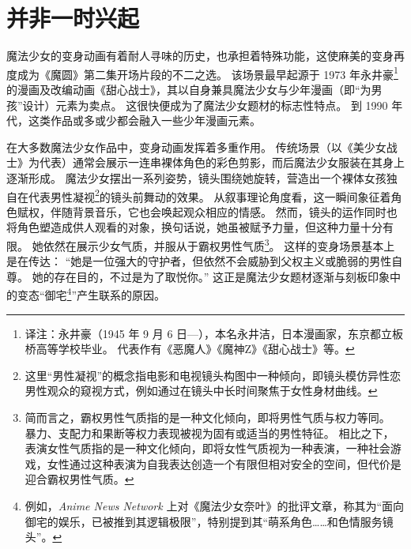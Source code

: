 \chapter[并非一时兴起]{并非一时兴起}



魔法少女的变身动画有着耐人寻味的历史，也承担着特殊功能，这使麻美的变身再度成为《魔圆》第二集开场片段的不二之选。
该场景最早起源于 1973 年永井豪\footnote{%
    译注：永井豪（1945 年 9 月 6 日—），本名永井洁，日本漫画家，东京都立板桥高等学校毕业。
    代表作有《恶魔人》《魔神Z》《甜心战士》等。
}的漫画及改编动画《甜心战士》，其以自身兼具魔法少女与少年漫画（即“为男孩”设计）元素为卖点\cite{ref19}。
这很快便成为了魔法少女题材的标志性特点。
到 1990 年代，这类作品或多或少都会融入一些少年漫画元素\cite{ref20}。

在大多数魔法少女作品中，变身动画发挥着多重作用。
传统场景（以《美少女战士》为代表）通常会展示一连串裸体角色的彩色剪影，而后魔法少女服装在其身上逐渐形成。
魔法少女摆出一系列姿势，镜头围绕她旋转，营造出一个裸体女孩独自在代表男性凝视\footnote{%
    这里“男性凝视”的概念指电影和电视镜头构图中一种倾向，即镜头模仿异性恋男性观众的窥视方式，例如通过在镜头中长时间聚焦于女性身材曲线。
}的镜头\cite{ref21}前舞动的效果。
从叙事理论角度看，这一瞬间象征着角色赋权，伴随背景音乐，它也会唤起观众相应的情感。
然而，镜头的运作同时也将角色塑造成供人观看的对象，换句话说，她虽被赋予力量，但这种力量十分有限。
她依然在展示少女气质，并服从于霸权男性气质\footnote{%
    简而言之，霸权男性气质指的是一种文化倾向，即将男性气质与权力等同。
    暴力、支配力和果断等权力表现被视为固有或适当的男性特征。
    相比之下，表演女性气质指的是一种文化倾向，即将女性气质视为一种表演，一种社会游戏，女性通过这种表演为自我表达创造一个有限但相对安全的空间，但代价是迎合霸权男性气质。
}\cite{ref22}。
这样的变身场景基本上是在传达：
“她是一位强大的守护者，但依然不会威胁到父权主义或脆弱的男性自尊。
她的存在目的，不过是为了取悦你。”
这正是魔法少女题材逐渐与刻板印象中的变态“御宅\footnote{%
    例如，\emph{Anime News Network} 上对《魔法少女奈叶》的批评文章，称其为“面向御宅的娱乐，已被推到其逻辑极限”，特别提到其“萌系角色……和色情服务镜头”。
}”产生联系的原因\cite{ref23}。

